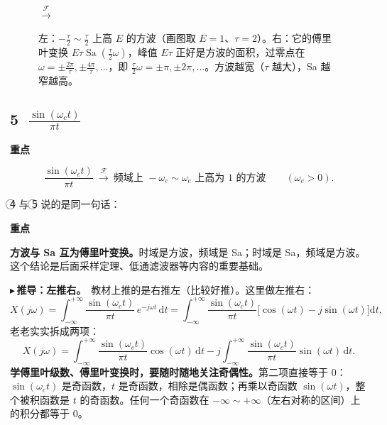 \documentclass[UTF8,a4paper,11pt]{ctexart}
\newcommand{\Sa}{\operatorname{Sa}}
\newcommand{\dd}{\mathrm{d}}
\newcommand{\F}{\mathcal{F}}
\newenvironment{remember}{\begin{rememberbox}\textbf{重点}\par\smallskip}{\end{rememberbox}}
\newcommand{\taxes}[5][t]{%
  \draw[->] (#2,0) -- (#3,0) node[right,font=\scriptsize] {$#1$};
  \draw[->] (0,#5) -- (0,#4);
  \node[anchor=north east,font=\tiny,gray!60!black,inner sep=1pt] at (0,-0.02) {$0$};}
\newcommand{\xt}[2]{\draw (#1,0) -- (#1,-0.1) node[anchor=north,font=\tiny,gray!60!black,fill=white,inner sep=0.6pt] {$#2$};}
\newcommand{\yt}[2]{\draw (0,#1) -- (-0.1,#1) node[anchor=east,font=\tiny,gray!60!black,fill=white,inner sep=0.6pt] {$#2$};}
\newcommand{\xtl}[3]{\draw (#1,0) -- (#1,-0.08); \draw[gray!55,densely dotted] (#1,-0.08) -- (#1,#3);
  \node[anchor=north,font=\tiny,gray!60!black,fill=white,inner sep=0.6pt] at (#1,#3) {$#2$};}
\newcounter{ex}[section]
\newcommand{\point}[1]{\par\addvspace{1ex}\noindent\textcolor{ptteal}{$\blacktriangleright$\,\textbf{#1}}\ }
\begin{document}
\begin{figure}[H]
\centering
{}
\quad$\xrightarrow{\ \F\ }$\quad
{}
\caption{左：$-\frac\tau2\sim\frac\tau2$ 上高 $E$ 的方波（画图取 $E=1$、$\tau=2$）。右：它的傅里叶变换 $E\tau\Sa(\frac\tau2\omega)$，峰值 $E\tau$ 正好是方波的面积，过零点在 $\omega=\pm\frac{2\pi}\tau,\pm\frac{4\pi}\tau,\dots$，即 $\frac\tau2\omega=\pm\pi,\pm2\pi,\dots$。方波越宽（$\tau$ 越大），Sa 越窄越高。}
\end{figure}

\subsection{\texorpdfstring{\textcircled{\scriptsize 5} $\frac{\sin(\omega_ct)}{\pi t}$}{⑤ sin(ωc t)/(πt)}}\label{sub:sinc}
\begin{remember}
\[
\frac{\sin(\omega_ct)}{\pi t}\ \xrightarrow{\ \F\ }\ \text{频域上 }-\omega_c\sim\omega_c\text{ 上高为 }1\text{ 的方波}\qquad(\omega_c>0).
\]
\end{remember}
\textcircled{\scriptsize 4} 与 \textcircled{\scriptsize 5} 说的是同一句话：
\begin{remember}
\textbf{方波与 Sa 互为傅里叶变换。}时域是方波，频域是 Sa；时域是 Sa，频域是方波。这个结论是后面采样定理、低通滤波器等内容的重要基础。
\end{remember}

\point{推导：左推右。}教材上推的是右推左（比较好推）。这里做左推右：
\[
X(j\omega)=\int_{-\infty}^{+\infty}\frac{\sin(\omega_ct)}{\pi t}\,e^{-j\omega t}\,\dd t
=\int_{-\infty}^{+\infty}\frac{\sin(\omega_ct)}{\pi t}\big[\cos(\omega t)-j\sin(\omega t)\big]\dd t ,
\]
老老实实拆成两项：
\[
X(j\omega)=\int_{-\infty}^{+\infty}\frac{\sin(\omega_ct)}{\pi t}\cos(\omega t)\,\dd t
-j\int_{-\infty}^{+\infty}\frac{\sin(\omega_ct)}{\pi t}\sin(\omega t)\,\dd t .
\]
\textbf{学傅里叶级数、傅里叶变换时，要随时随地关注奇偶性。}第二项直接等于 $0$：$\sin(\omega_ct)$ 是奇函数，$t$ 是奇函数，相除是偶函数；再乘以奇函数 $\sin(\omega t)$，整个被积函数是 $t$ 的奇函数。任何一个奇函数在 $-\infty\sim+\infty$（左右对称的区间）上的积分都等于 $0$。
\end{document}
